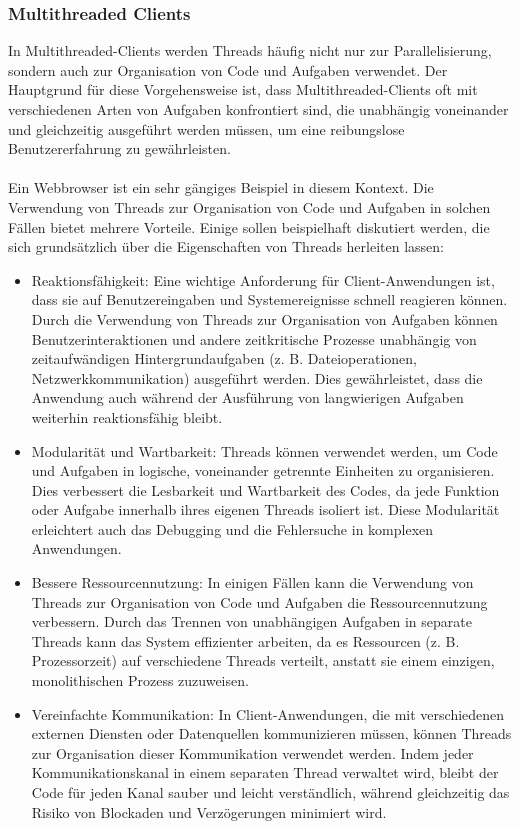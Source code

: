 \subsubsection{Multithreaded Clients}
In Multithreaded-Clients werden Threads häufig nicht nur zur Parallelisierung, sondern auch zur Organisation von Code und Aufgaben verwendet. Der Hauptgrund für diese Vorgehensweise ist, dass Multithreaded-Clients oft mit verschiedenen Arten von Aufgaben konfrontiert sind, die unabhängig voneinander und gleichzeitig ausgeführt werden müssen, um eine reibungslose Benutzererfahrung zu gewährleisten.
\\\\
Ein Webbrowser ist ein sehr gängiges Beispiel in diesem Kontext. Die Verwendung von Threads zur Organisation von Code und Aufgaben in solchen Fällen bietet mehrere Vorteile. Einige sollen beispielhaft diskutiert werden, die sich grundsätzlich über die Eigenschaften von Threads herleiten lassen:
\begin{itemize}
\item Reaktionsfähigkeit: Eine wichtige Anforderung für Client-Anwendungen ist, dass sie auf Benutzereingaben und Systemereignisse schnell reagieren können. Durch die Verwendung von Threads zur Organisation von Aufgaben können Benutzerinteraktionen und andere zeitkritische Prozesse unabhängig von zeitaufwändigen Hintergrundaufgaben (z. B. Dateioperationen, Netzwerkkommunikation) ausgeführt werden. Dies gewährleistet, dass die Anwendung auch während der Ausführung von langwierigen Aufgaben weiterhin reaktionsfähig bleibt.
\item Modularität und Wartbarkeit: Threads können verwendet werden, um Code und Aufgaben in logische, voneinander getrennte Einheiten zu organisieren. Dies verbessert die Lesbarkeit und Wartbarkeit des Codes, da jede Funktion oder Aufgabe innerhalb ihres eigenen Threads isoliert ist. Diese Modularität erleichtert auch das Debugging und die Fehlersuche in komplexen Anwendungen.
\item Bessere Ressourcennutzung: In einigen Fällen kann die Verwendung von Threads zur Organisation von Code und Aufgaben die Ressourcennutzung verbessern. Durch das Trennen von unabhängigen Aufgaben in separate Threads kann das System effizienter arbeiten, da es Ressourcen (z. B. Prozessorzeit) auf verschiedene Threads verteilt, anstatt sie einem einzigen, monolithischen Prozess zuzuweisen.
\item Vereinfachte Kommunikation: In Client-Anwendungen, die mit verschiedenen externen Diensten oder Datenquellen kommunizieren müssen, können Threads zur Organisation dieser Kommunikation verwendet werden. Indem jeder Kommunikationskanal in einem separaten Thread verwaltet wird, bleibt der Code für jeden Kanal sauber und leicht verständlich, während gleichzeitig das Risiko von Blockaden und Verzögerungen minimiert wird.
\end{itemize}
